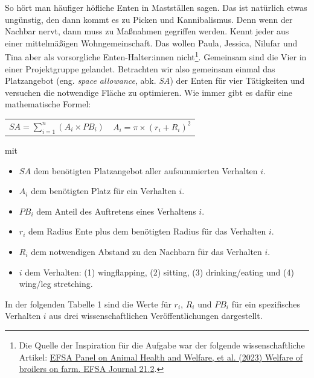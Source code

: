 \documentclass[a4paper, 9pt]{scrartcl}\usepackage[]{graphicx}\usepackage[]{xcolor}
\begin{document}
So hört man häufiger höfliche Enten in Mastställen sagen. Das ist natürlich etwas ungünstig, den dann kommt es zu Picken und Kannibalismus. Denn wenn der Nachbar nervt, dann muss zu Maßnahmen gegriffen werden. Kennt jeder aus einer mittelmäßigen Wohngemeinschaft. Das wollen Paula, Jessica, Nilufar und Tina aber als vorsorgliche Enten-Halter:innen nicht\footnote{Die Quelle der Inspiration für die Aufgabe war der folgende wissenschaftliche Artikel: \href{https://www.efsa.europa.eu/en/efsajournal/pub/7788}{EFSA Panel on Animal Health and Welfare, et al. (2023) Welfare of broilers on farm. EFSA Journal 21.2}.}. Gemeinsam sind die Vier in einer Projektgruppe gelandet. Betrachten wir also gemeinsam einmal das Platzangebot (eng. \textit{space allowance}, abk. \textit{SA}) der Enten für vier Tätigkeiten und versuchen die notwendige Fläche zu optimieren. Wie immer gibt es dafür eine mathematische Formel:

\begin{center}
  \begin{tabular}{cc}
    $SA = \sum^n_{i = 1} (A_i \times PB_i)$ & $A_i = \pi \times (r_i + R_i)^2$\\
  \end{tabular}
\end{center}

\vspace{-2Ex}

mit

\begin{itemize}[noitemsep]
\item $SA$ dem benötigten Platzangebot aller aufsummierten Verhalten $i$.
\item $A_i$ dem benötigten Platz für ein Verhalten $i$. 
\item $PB_i$ dem Anteil des Auftretens eines Verhaltens $i$.
\item $r_i$ dem Radius Ente plus dem benötigten Radius für das Verhalten $i$.
\item $R_i$ dem notwendigen Abstand zu den Nachbarn für das Verhalten $i$.    
\item $i$ dem Verhalten: (1) wingflapping, (2) sitting, (3)
  drinking/eating und (4) wing/leg stretching.
\end{itemize}

In der folgenden Tabelle 1 sind die Werte für $r_i$, $R_i$ und $PB_i$ für ein spezifisches Verhalten $i$ aus drei wissenschaftlichen Veröffentlichungen dargestellt.

\vspace{-1Ex}
\end{document}
